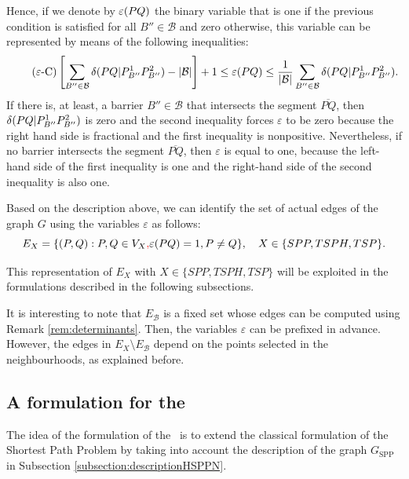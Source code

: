 \documentclass[a4paper,  review, authoryear, 1p.]{elsarticle}
\newcommand{\SPPN}{{\sf{H-SPPN}\xspace }}
\newcommand{\B}{{\mathcal B}}
\newcommand{\EB}{{E^{}_{\mathcal B}}}
\newcommand{\GSPP}{{G_{\text{SPP}}}}
\newcommand{\CV}[1]{{\color{red}#1}}
\newcommand{\segment}[2]{\overline{#1#2}}
\newcommand{\determinant}[3]{\det({#1|#2#3})}
\begin{document}
	Hence, if we denote by $\varepsilon(PQ)$ the binary variable that is one if the previous condition is satisfied for all $B''\in\B$ and zero otherwise, this variable can be represented by means of the following inequalities:
	\begin{equation*}\tag{$\varepsilon$-C}\label{eq:varepsilonC}
		\left[\sum_{B''\in\mathcal B}\deltacheck{P}{Q}{P^1_{B''}}{P^2_{B''}}-|\mathcal B|\right] + 1\leq \varepsilonvar{P}{Q}\leq \frac{1}{|\B|}\sum_{B''\in\mathcal B}\deltacheck{P}{Q}{P^1_{B''}}{P^2_{B''}}.
	\end{equation*}
	If there is, at least, a barrier $B''\in\B$ that intersects the segment $\overline{PQ}$, then $\delta(PQ|P^1_{B''}P^2_{B''})$ is zero and the second inequality forces $\varepsilon$ to be zero because the right hand side is fractional and the first inequality is nonpositive. Nevertheless, if no barrier intersects the segment $\segment{P}{Q}$, then $\varepsilon$ is equal to one, because the left-hand side of the first inequality is one and the right-hand side of the second inequality is also one. 
	
	Based on the description above, we can identify the set of actual edges of the graph $G$ using the variables $\varepsilon$ as follows:
	$$ E_X = \{(P, Q):P,Q\in V_X\CV{,} \varepsilonvar{P}{Q}=1, P\neq Q\}, \quad X\in \{SPP,TSPH,TSP\}.$$
	
	This representation of $E_X$ with $X\in \{SPP,TSPH,TSP\}$ will be exploited in the formulations described in the following subsections. 
	
	
	It is interesting to note that $\EB$ is a fixed set whose edges can be computed using Remark \ref{rem:determinants}. Then, the variables $\varepsilon$ can be prefixed in advance. However, the edges in $E_X\setminus \EB$ depend on the points selected in the neighbourhoods, \CV{as explained before. }
	

	
	
	
	
	
	
	\subsection{A formulation for the \SPPN}
	The idea of the formulation of the \SPPN \ is to extend the classical formulation of the Shortest Path Problem by taking into account the description of the graph $\GSPP$ in Subsection \ref{subsection:descriptionHSPPN}.
	
\end{document}
